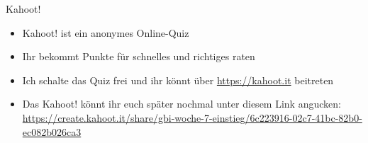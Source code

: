 \framePrevEpisode

\begin{frame}{Kahoot!}
	\begin{itemize}[<+->]
		\item Kahoot! ist ein anonymes Online-Quiz
		\item Ihr bekommt Punkte für schnelles und richtiges raten
		\item Ich schalte das Quiz frei und ihr könnt über \url{https://kahoot.it} beitreten
		\item Das Kahoot! könnt ihr euch später nochmal unter diesem Link angucken: \\
			\url{https://create.kahoot.it/share/gbi-woche-7-einstieg/6c223916-02c7-41bc-82b0-ec082b026ca3}
	\end{itemize}
\end{frame}



